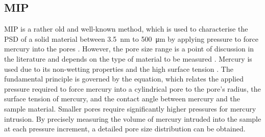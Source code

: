 
\subsection{\Acl*{MIP}}
\label{sec:mip}
\ac{MIP} is a rather old and well-known method, which is used to characterise the \ac{PSD} of a solid material between \qty{3.5}{\nano\meter} to \qty{500}{\micro\meter} by applying pressure to force mercury into the pores \cite{giesche.2002}. %
However, the pore size range is a point of discussion in the literature and depends on the type of material to be measured \cite{oualmakran.2016, zhang.2019a}.
Mercury is used due to its non-wetting properties and the high surface tension \cite{giesche.2002}. %
The fundamental principle is governed by the \textcite{washburn.1921} equation, which relates the applied pressure required to force mercury into a cylindrical pore to the pore's radius, the surface tension of mercury, and the contact angle between mercury and the sample material.
Smaller pores require significantly higher pressures for mercury intrusion.
By precisely measuring the volume of mercury intruded into the sample at each pressure increment, a detailed pore size distribution can be obtained.


